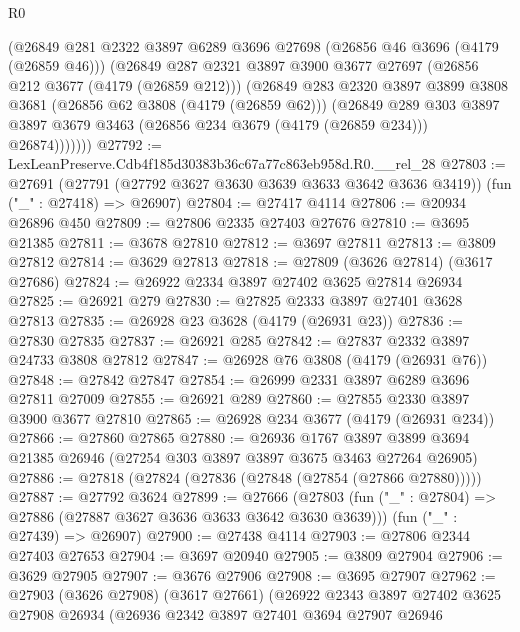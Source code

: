 \begin{lexlean}{R0}
\begin{coremodule}
          (@26849
            @281
            @2322
            @3897
            @6289
            @3696
            @27698
            (@26856 @46 @3696 (@4179 (@26859 @46)))
            (@26849
              @287
              @2321
              @3897
              @3900
              @3677
              @27697
              (@26856 @212 @3677 (@4179 (@26859 @212)))
              (@26849
                @283
                @2320
                @3897
                @3899
                @3808
                @3681
                (@26856 @62 @3808 (@4179 (@26859 @62)))
                (@26849
                  @289
                  @303
                  @3897
                  @3897
                  @3679
                  @3463
                  (@26856 @234 @3679 (@4179 (@26859 @234)))
                  @26874)))))))
@27792 := LexLeanPreserve.Cdb4f185d30383b36c67a77c863eb958d.R0.__rel_28
@27803 := @27691
    (@27791 (@27792 @3627 @3630 @3639 @3633 @3642 @3636 @3419))
    (fun ("_" : @27418) => @26907)
@27804 := @27417 @4114
@27806 := @20934 @26896 @450
@27809 := @27806 @2335 @27403 @27676
@27810 := @3695 @21385
@27811 := @3678 @27810
@27812 := @3697 @27811
@27813 := @3809 @27812
@27814 := @3629 @27813
@27818 := @27809 (@3626 @27814) (@3617 @27686)
@27824 := @26922 @2334 @3897 @27402 @3625 @27814 @26934
@27825 := @26921 @279
@27830 := @27825 @2333 @3897 @27401 @3628 @27813
@27835 := @26928 @23 @3628 (@4179 (@26931 @23))
@27836 := @27830 @27835
@27837 := @26921 @285
@27842 := @27837 @2332 @3897 @24733 @3808 @27812
@27847 := @26928 @76 @3808 (@4179 (@26931 @76))
@27848 := @27842 @27847
@27854 := @26999 @2331 @3897 @6289 @3696 @27811 @27009
@27855 := @26921 @289
@27860 := @27855 @2330 @3897 @3900 @3677 @27810
@27865 := @26928 @234 @3677 (@4179 (@26931 @234))
@27866 := @27860 @27865
@27880 := @26936
    @1767
    @3897
    @3899
    @3694
    @21385
    @26946
    (@27254 @303 @3897 @3897 @3675 @3463 @27264 @26905)
@27886 := @27818 (@27824 (@27836 (@27848 (@27854 (@27866 @27880)))))
@27887 := @27792 @3624
@27899 := @27666
    (@27803 (fun ("_" : @27804) => @27886 (@27887 @3627 @3636 @3633 @3642 @3630 @3639)))
    (fun ("_" : @27439) => @26907)
@27900 := @27438 @4114
@27903 := @27806 @2344 @27403 @27653
@27904 := @3697 @20940
@27905 := @3809 @27904
@27906 := @3629 @27905
@27907 := @3676 @27906
@27908 := @3695 @27907
@27962 := @27903
    (@3626 @27908)
    (@3617 @27661)
    (@26922
      @2343
      @3897
      @27402
      @3625
      @27908
      @26934
      (@26936
        @2342
        @3897
        @27401
        @3694
        @27907
        @26946

\end{coremodule}
\end{lexlean}

